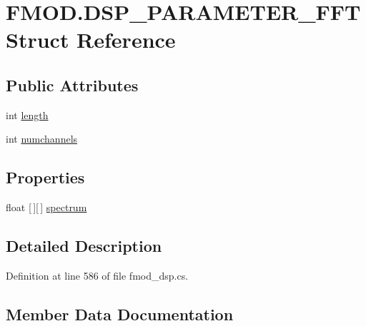 \hypertarget{struct_f_m_o_d_1_1_d_s_p___p_a_r_a_m_e_t_e_r___f_f_t}{}\section{F\+M\+O\+D.\+D\+S\+P\+\_\+\+P\+A\+R\+A\+M\+E\+T\+E\+R\+\_\+\+F\+FT Struct Reference}
\label{struct_f_m_o_d_1_1_d_s_p___p_a_r_a_m_e_t_e_r___f_f_t}
\subsection*{Public Attributes}
\begin{DoxyCompactItemize}
\item 
int \hyperlink{struct_f_m_o_d_1_1_d_s_p___p_a_r_a_m_e_t_e_r___f_f_t_a753886179c5346656fad07eb1f520cc0}{length}
\item 
int \hyperlink{struct_f_m_o_d_1_1_d_s_p___p_a_r_a_m_e_t_e_r___f_f_t_ac6dc8c948557d663ef71f8dff40f892f}{numchannels}
\end{DoxyCompactItemize}
\subsection*{Properties}
\begin{DoxyCompactItemize}
\item 
float \mbox{[}$\,$\mbox{]}\mbox{[}$\,$\mbox{]} \hyperlink{struct_f_m_o_d_1_1_d_s_p___p_a_r_a_m_e_t_e_r___f_f_t_a7da329b029883dd02e7eb2f20364b427}{spectrum}
\end{DoxyCompactItemize}


\subsection{Detailed Description}


Definition at line 586 of file fmod\+\_\+dsp.\+cs.



\subsection{Member Data Documentation}
\mbox{\label{struct_f_m_o_d_1_1_d_s_p___p_a_r_a_m_e_t_e_r___f_f_t_a753886179c5346656fad07eb1f520cc0}} 
